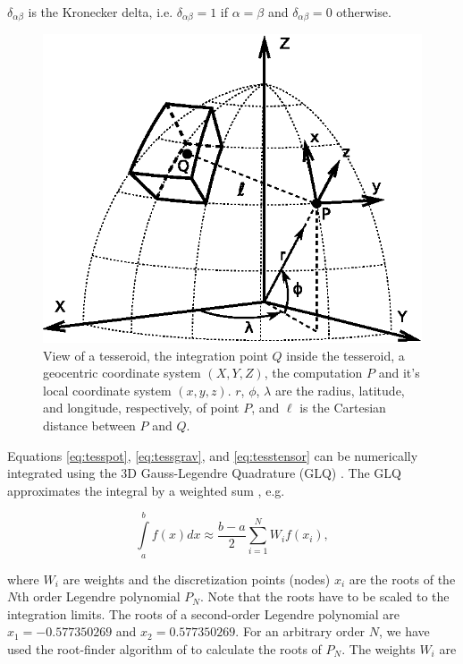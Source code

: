 \noindent
$\delta_{\alpha\beta}$ is the Kronecker delta,
i.e. $\delta_{\alpha\beta}=1$ if $\alpha=\beta$
and $\delta_{\alpha\beta}=0$ otherwise.

\begin{figure}
    \centering
    \includegraphics{figs/tesseroid}
    \caption{
        View of a tesseroid,
        the integration point $Q$ inside the tesseroid,
        a geocentric coordinate system $(X, Y, Z)$,
        the computation $P$ and it's local coordinate system $(x, y, z)$.
        $r$, $\phi$, $\lambda$ are
        the radius, latitude, and longitude, respectively, of point $P$,
        and $\ell$ is the Cartesian distance between $P$ and $Q$.
    }
    \label{fig:tesseroid}
\end{figure}

Equations
\ref{eq:tesspot},
\ref{eq:tessgrav},
and
\ref{eq:tesstensor}
can be numerically integrated using
the 3D Gauss-Legendre Quadrature (GLQ)
\citep{Asgharzadeh2007}.
The GLQ
approximates the integral by
a weighted sum
\citep{Hildebrand1987},
e.g.

\begin{equation}
    \int\limits_a^b f(x) dx \approx
    \frac{b-a}{2}\sum\limits_{i=1}^N W_i f(x_i),
\end{equation}

\noindent
where
$W_i$ are weights and
the discretization points (nodes) $x_i$
are the roots of the $N$th order Legendre polynomial $P_N$.
Note that the roots have to be scaled to the integration limits.
The roots of a second-order Legendre polynomial are
$x_1=-0.577350269$ and $x_2=0.577350269$.
For an arbitrary order $N$,
we have used the root-finder algorithm
of \citet{Barrera-Figueroa2006}
to calculate the roots of $P_N$.
The weights $W_i$ are \citep{Hildebrand1987}

